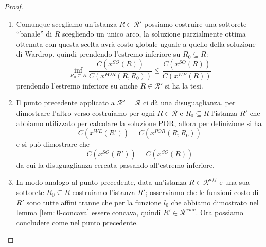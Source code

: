 \documentclass[a4paper]{article}
\theoremstyle{plain}
\theoremstyle{definition}
\theoremstyle{remark}
\newcommand{\pa}[1]{\left(#1\right)}
\begin{document}
\begin{proof}
  \begin{enumerate}
  \item Comunque scegliamo un'istanza $R\in \mathcal{R'}$ possiamo
    costruire una sottorete ``banale'' di $R$ scegliendo un unico
    arco, la soluzione parzialmente ottima ottenuta con questa scelta
    avrà costo globale uguale a quello della soluzione di Wardrop,
    quindi prendendo l'estremo inferiore su $R_0\subseteq R$:
    \[ \inf _{R_0\subseteq R}
      \frac{C\pa{x^{SO}(R)}}{C\pa{x^{POR}(R,R_0)}} \le
      \frac{C\pa{x^{SO}(R)}}{C\pa{x^{WE}(R)}} \]
    prendendo l'estremo inferiore su anche $R\in \mathcal{R}'$ si ha
    la tesi.
  \item Il punto precedente applicato a $\mathcal{R'} =\mathcal{R}$ ci
    dà una disuguaglianza, per dimostrare l'altro verso costruiamo per
    ogni $R\in \mathcal{R}$ e $R_0\subseteq R$ l'istanza $R'$ che
    abbiamo utilizzato per calcolare la soluzione POR, allora per
    definizione si ha
    \[ C\pa{x^{WE}\pa{R'}} = C\pa{x^{POR}\pa{R,R_0}} \]
    e si può dimostrare che
    \[ C\pa{x^{SO}\pa{R'}} = C\pa{x^{SO}\pa{R}} \]
    da cui la disuguaglianza cercata passando all'estremo inferiore.
  \item In modo analogo al punto precedente, data un'istanza $R\in
    \mathcal{R}^{aff}$ e una sua sottorete $R_0\subseteq R$ costruiamo
    l'istanza $R'$; osserviamo che le funzioni costo di $R'$ sono
    tutte affini tranne che per la funzione $l_0$ che abbiamo
    dimostrato nel lemma \ref{lem:l0-concava} essere concava, quindi
    $R'\in \mathcal{R}^{conc}$. Ora possiamo concludere come nel punto
    precedente.
  \end{enumerate}
\end{proof}
\end{document}

